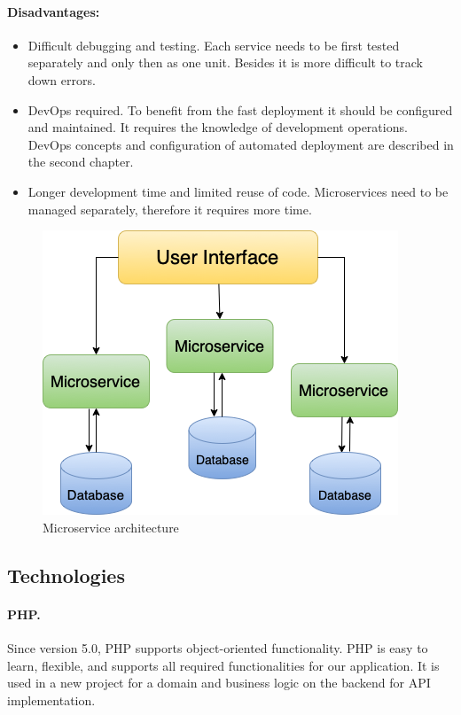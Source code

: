 \paragraph*{Disadvantages:}
\begin{itemize}
  \item Difficult debugging and testing. Each service needs to be first tested separately and only then as one unit. Besides it is more difficult to track down errors.

  \item DevOps required. To benefit from the fast deployment it should be configured and maintained. It requires the knowledge of development operations. DevOps concepts and configuration of automated deployment are described in the second chapter.

  \item Longer development time and limited reuse of code. Microservices need to be managed separately, therefore it requires more time.
\end{itemize}

\begin{figure}[hp]
\centering
\includegraphics[scale=0.67]{../png/microservices.png}
\caption{Microservice architecture}\label{picture:mvp}
\end{figure}




\subsection{Technologies}

\paragraph*{PHP.} Since version 5.0, PHP supports object-oriented functionality. PHP is easy to learn, flexible, and supports all required functionalities for our application. It is used in a new project for a domain and business logic on the backend for API implementation.


